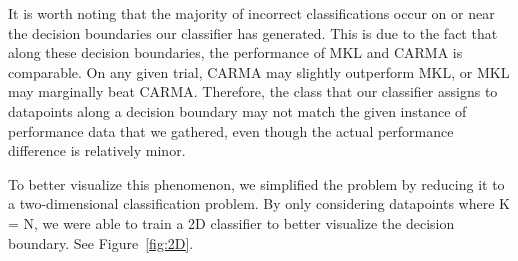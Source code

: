 It is worth noting that the majority of incorrect classifications occur on or near the decision boundaries our classifier has generated.
This is due to the fact that along these decision boundaries, the performance of MKL and CARMA is comparable.
On any given trial, CARMA may slightly outperform MKL, or MKL may marginally beat CARMA.
Therefore, the class that our classifier assigns to datapoints along a decision boundary may not match the given instance of performance data that we gathered, even though the actual performance difference is relatively minor.

To better visualize this phenomenon, we simplified the problem by reducing it to a two-dimensional classification problem.
By only considering datapoints where K = N, we were able to train a 2D classifier to better visualize the decision boundary.
See Figure~\ref{fig:2D}.

